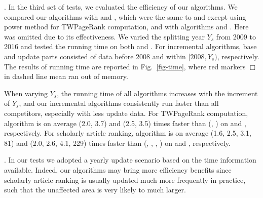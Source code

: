 .
In the third set of tests, we evaluated the efficiency of our algorithms.
%
We compared our algorithms with \powtwprscc and \powensemble, which were the same to \twprscc and \batensemble except using power method for TWPageRank computation, and with algorithms \futurerank and \hhgrank.
Here \pagerank was omitted due to its effectiveness.
%
We varied the splitting year $Y_s$ from 2009 to 2016 and tested the running time on both \aminer and \magdata.
%
For incremental algorithms, base and update parts consisted of data before 2008 and within $[2008, Y_s)$, respectively.
%
The results of running time are reported in Fig.~\ref{fig-time}, where red markers $\Box$ in dashed line mean \hhgrank ran out of memory.

When varying $Y_s$, the running time of all algorithms increases with the increment of $Y_s$, and our incremental algorithms
consistently run faster than all competitors, especially with less update data.
%
For TWPageRank computation, algorithm \inctwprscc is on average (2.0, 3.7) and (2.5, 3.5) times faster than (\twprscc, \powtwprscc) on \aminer and \magdata, respectively.
%
For scholarly article ranking, algorithm \incensemble is on average (1.6, 2.5, 3.1, 81) and (2.0, 2.6, 4.1, 229) times faster than (\batensemble, \powensemble, \futurerank, \hhgrank) on \aminer and \magdata, respectively.

.
In our tests we adopted a yearly update scenario based on the time information available. Indeed, our algorithms may bring  more efficiency benefits since scholarly article ranking is usually updated much more frequently in practice, such that the unaffected area is very likely to much larger.




